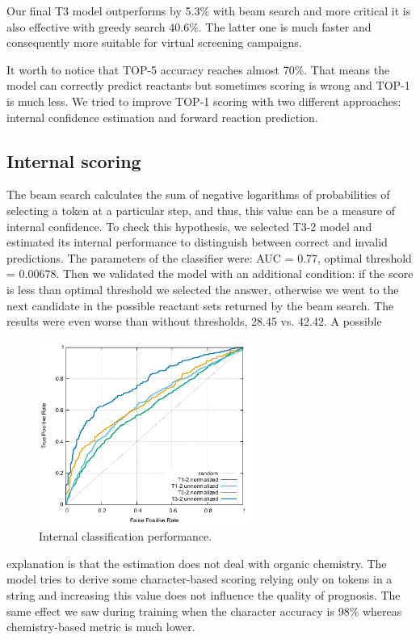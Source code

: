 \documentclass{article}
\begin{document}
Our final T3 model outperforms \cite{Pande} by 5.3\% with beam search and more critical it is also effective with greedy search 40.6\%. The latter one is much faster and consequently more suitable for virtual screening campaigns. 

It worth to notice that TOP-5 accuracy reaches almost 70\%. That means the model can correctly predict reactants but sometimes scoring is wrong and TOP-1 is much less. We tried to improve TOP-1 scoring with two different approaches: internal confidence estimation and forward reaction prediction. 

\subsection{Internal scoring}

The beam search calculates the sum of negative logarithms of probabilities of selecting a token at a particular step, and thus, this value can be a measure of internal confidence. To check this hypothesis, we selected T3-2 model and estimated its internal performance to distinguish between correct and invalid predictions.  The parameters of the classifier were: AUC = 0.77, optimal threshold = 0.00678. Then we validated the model with an additional condition: if the score is less than optimal threshold we selected the answer, otherwise we went to the next candidate in the possible reactant sets returned by the beam search. The results were even worse than without thresholds, 28.45 vs. 42.42.   A possible\begin{figure}  
  \vspace{-0.2cm}
  \includegraphics[width = 7cm]{images/auc.pdf}
  \caption{Internal classification performance.}
  \label{fig:auc}
  \vspace{-1.5cm}
\end{figure}
 explanation is that the estimation does not deal with organic chemistry. The model tries to derive some character-based scoring relying only on tokens in a string and increasing this value does not influence the quality of prognosis. The same effect we saw during training when the character accuracy is 98\% whereas chemistry-based metric is much lower. 
 
\end{document}
